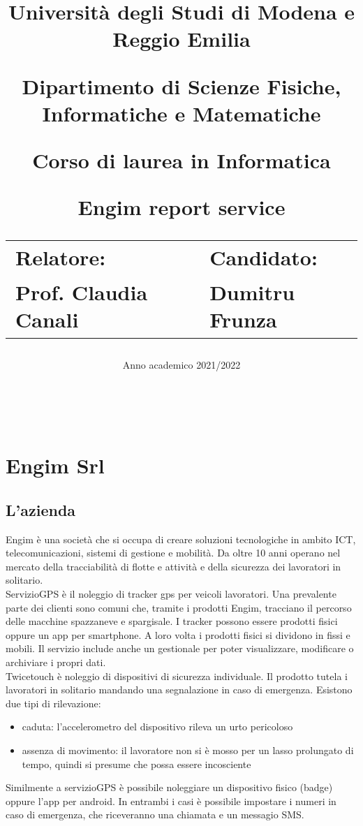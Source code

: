 \documentclass[12pt]{article}
\author{}
\title{
    \huge 
        \textbf{Università degli Studi di Modena e Reggio Emilia}
    \large
        \par Dipartimento di Scienze Fisiche, Informatiche e Matematiche
        \par Corso di laurea in Informatica
    \vfil
        \huge \par \textbf{Engim report service}
    \vfil
    \normalsize
    \begin{tabular}{lp{0.4\textwidth}l}
      Relatore: & & Candidato: \\
      Prof. Claudia Canali & &  Dumitru Frunza \\
      \end{tabular}
}
\date{Anno academico 2021/2022}
\begin{document}
\maketitle
\thispagestyle{empty}
\newpage 
\thispagestyle{empty}
\
\newpage
{}
\addtocounter{page}{0}
\listoffigures
\newpage
{}
\tableofcontents
{}
\newpage

\addtocounter{page}{0}
\section{Engim Srl}
\subsection{L'azienda}
Engim è una società che si occupa di creare soluzioni tecnologiche in ambito 
ICT, telecomunicazioni, sistemi di gestione e mobilità. Da oltre 10 anni operano 
nel mercato della tracciabilità di flotte e attività e della 
sicurezza dei lavoratori in solitario.
\\ ServizioGPS è il noleggio di tracker gps per veicoli lavoratori. 
Una prevalente parte dei clienti sono comuni che, tramite i prodotti Engim, 
tracciano il percorso delle macchine spazzaneve e spargisale.
I tracker possono essere prodotti fisici oppure un app per smartphone. A loro 
volta i prodotti fisici si dividono in fissi e mobili. Il servizio include
anche un gestionale per poter visualizzare, modificare o archiviare i propri dati.
\\ Twicetouch è noleggio di dispositivi di sicurezza individuale.
Il prodotto tutela i lavoratori in solitario mandando una segnalazione in caso di
emergenza. Esistono due tipi di rilevazione: 
\begin{itemize}
  \item caduta: l'accelerometro del dispositivo rileva un urto pericoloso
  \item assenza di movimento: il lavoratore non si è mosso per un lasso prolungato di tempo, 
  quindi si presume che possa essere incosciente
\end{itemize}
Similmente a servizioGPS è possibile noleggiare un dispositivo fisico (badge) oppure
l'app per android. In entrambi i casi è possibile impostare i numeri in caso di 
emergenza, che riceveranno una chiamata e un messagio SMS.
\end{document}
